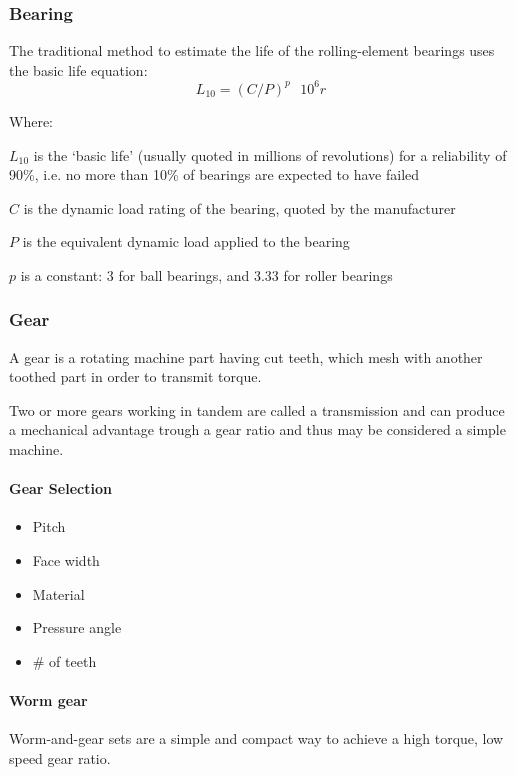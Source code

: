 \subsubsection{Bearing}
The traditional method to estimate the life of the rolling-element bearings uses the basic life equation:
$$L_{10} = (C/P)^p \mbox{    }10^6 r$$

Where:

$L_{10}$ is the `basic life' (usually quoted in millions of revolutions) for a reliability of 90\%, i.e. no more than 10\% of bearings are expected to have failed

$C$ is the dynamic load rating of the bearing, quoted by the manufacturer

$P$ is the equivalent dynamic load applied to the bearing

$p$ is a constant: 3 for ball bearings, and 3.33 for roller bearings

\subsubsection{Gear}
A gear is a rotating machine part having cut teeth, which mesh with another toothed part in order to transmit torque.

Two or more gears working in tandem are called a transmission and can produce a mechanical advantage trough a gear ratio and thus may be considered a simple machine.

\paragraph{Gear Selection}
\begin{itemize}
  \item Pitch
  \item Face width
  \item Material
  \item Pressure angle
  \item \# of teeth
\end{itemize}

\paragraph{Worm gear} Worm-and-gear sets are a simple and compact way to achieve a high torque, low speed gear ratio.

